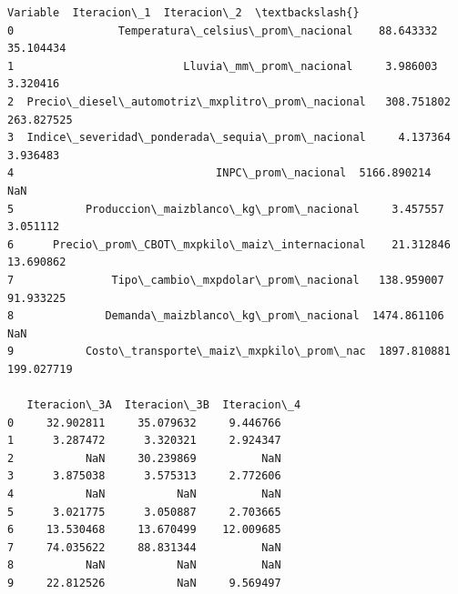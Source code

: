\documentclass[11pt]{article}
\makeatletter
\newcommand{\boxspacing}{\kern\kvtcb@left@rule\kern\kvtcb@boxsep}
\newcommand{\prompt}[4]{
        {\ttfamily\llap{{\color{#2}[#3]:\hspace{3pt}#4}}\vspace{-\baselineskip}}
    }
\makeatother
\begin{document}
            \begin{tcolorbox}[breakable, size=fbox, boxrule=.5pt, pad at break*=1mm, opacityfill=0]
\prompt{Out}{outcolor}{48}{\boxspacing}
\begin{Verbatim}[commandchars=\\\{\}]
                                          Variable  Iteracion\_1  Iteracion\_2  \textbackslash{}
0                Temperatura\_celsius\_prom\_nacional    88.643332    35.104434
1                          Lluvia\_mm\_prom\_nacional     3.986003     3.320416
2  Precio\_diesel\_automotriz\_mxplitro\_prom\_nacional   308.751802   263.827525
3  Indice\_severidad\_ponderada\_sequia\_prom\_nacional     4.137364     3.936483
4                               INPC\_prom\_nacional  5166.890214          NaN
5           Produccion\_maizblanco\_kg\_prom\_nacional     3.457557     3.051112
6      Precio\_prom\_CBOT\_mxpkilo\_maiz\_internacional    21.312846    13.690862
7               Tipo\_cambio\_mxpdolar\_prom\_nacional   138.959007    91.933225
8              Demanda\_maizblanco\_kg\_prom\_nacional  1474.861106          NaN
9           Costo\_transporte\_maiz\_mxpkilo\_prom\_nac  1897.810881   199.027719

   Iteracion\_3A  Iteracion\_3B  Iteracion\_4
0     32.902811     35.079632     9.446766
1      3.287472      3.320321     2.924347
2           NaN     30.239869          NaN
3      3.875038      3.575313     2.772606
4           NaN           NaN          NaN
5      3.021775      3.050887     2.703665
6     13.530468     13.670499    12.009685
7     74.035622     88.831344          NaN
8           NaN           NaN          NaN
9     22.812526           NaN     9.569497
\end{Verbatim}
\end{tcolorbox}
        
\end{document}

